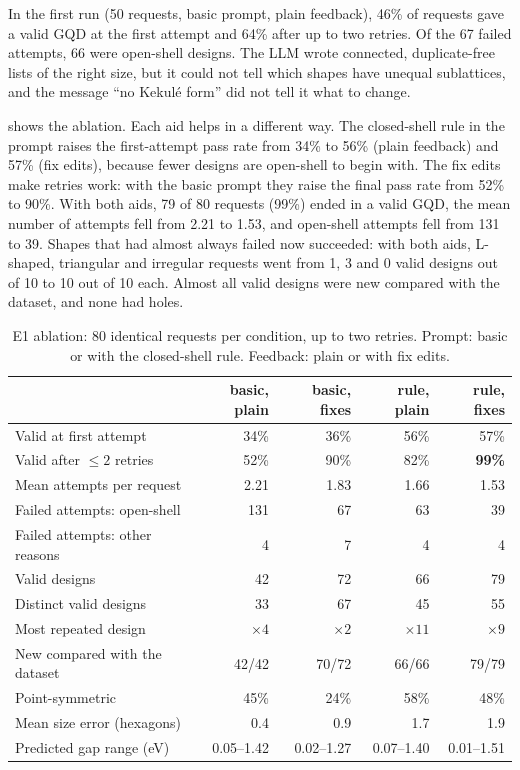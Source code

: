 In the first run (50 requests, basic prompt, plain feedback), 46\% of requests gave a valid GQD at
the first attempt and 64\% after up to two retries. Of the 67 failed attempts, 66 were open-shell
designs. The LLM wrote connected, duplicate-free lists of the right size, but it could not tell
which shapes have unequal sublattices, and the message ``no Kekul\'e form'' did not tell it what to
change.

 shows the ablation. Each aid helps in a different way. The closed-shell rule in the
prompt raises the first-attempt pass rate from 34\% to 56\% (plain feedback) and 57\% (fix edits), because fewer designs are
open-shell to begin with. The fix edits make retries work: with the basic prompt they raise the
final pass rate from 52\% to 90\%. With both aids, 79 of 80 requests (99\%) ended in a valid GQD,
the mean number of attempts fell from 2.21 to 1.53, and open-shell attempts fell from 131 to 39.
Shapes that had almost always failed now succeeded: with both aids, L-shaped, triangular and
irregular requests went from 1, 3 and 0 valid designs out of 10 to 10 out of 10 each. Almost all
valid designs were new compared with the dataset, and none had holes.

\begin{table}[ht]
  \centering
  \caption{E1 ablation: 80 identical requests per condition, up to two retries. Prompt: basic or
           with the closed-shell rule. Feedback: plain or with fix edits.}
  \label{tab:e1}
  \small
  \begin{tabular}{@{}lrrrr@{}}
    \toprule
    & basic, plain & basic, fixes & rule, plain & rule, fixes \\
    \midrule
    Valid at first attempt & 34\% & 36\% & 56\% & 57\% \\
    Valid after \(\leq 2\) retries & 52\% & 90\% & 82\% & \textbf{99\%} \\
    Mean attempts per request & 2.21 & 1.83 & 1.66 & 1.53 \\
    Failed attempts: open-shell & 131 & 67 & 63 & 39 \\
    Failed attempts: other reasons & 4 & 7 & 4 & 4 \\
    Valid designs & 42 & 72 & 66 & 79 \\
    Distinct valid designs & 33 & 67 & 45 & 55 \\
    Most repeated design & \(\times 4\) & \(\times 2\) & \(\times 11\) & \(\times 9\) \\
    New compared with the dataset & 42/42 & 70/72 & 66/66 & 79/79 \\
    Point-symmetric & 45\% & 24\% & 58\% & 48\% \\
    Mean size error (hexagons) & 0.4 & 0.9 & 1.7 & 1.9 \\
    Predicted gap range (eV) & 0.05--1.42 & 0.02--1.27 & 0.07--1.40 & 0.01--1.51 \\
    \bottomrule
  \end{tabular}
\end{table}

